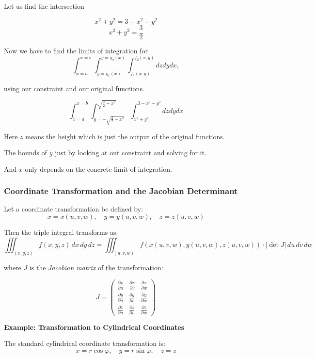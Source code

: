 Let us find the intersection

\[
x^2 + y^2 = 3 -x^2 - y^2 
\]
\[
x^2 + y^2 = \frac{3}{2}
\]

Now we have to find the limits of integration for 
\[
\int_{x=a}^{x=b}\int_{y=g_1(x)}^{y=g_2(x)} \int_{f_1(x,y)}^{f_2(x,y)} dz dy dx,
\]

using our constraint and our original functions.

\[
\int_{x=a}^{x=b}\int_{y=-\sqrt{\frac{3}{2} - x^2}}^{\sqrt{\frac{3}{2} -x^2}} \int_{x^2 + y^3}^{3-x^2-y^2} dz dy dx
\]

Here \(z\) means the height which is just the output
of the original functions.

The bounds of \(y\) just by looking at out constraint and solving for it.

And \(x\) only depends on the concrete limit of integration.


\subsubsection{Coordinate Transformation and the Jacobian Determinant}

Let a coordinate transformation be defined by:
\[
x = x(u, v, w), \quad y = y(u, v, w), \quad z = z(u, v, w)
\]

Then the triple integral transforms as:
\[
\iiint_{(x, y, z)} f(x, y, z)\, dx\, dy\, dz = \iiint_{(u, v, w)} f(x(u, v, w), y(u, v, w), z(u, v, w)) \cdot \left| \det J \right|\, du\, dv\, dw
\]

where \( J \) is the \emph{Jacobian matrix} of the transformation:

\[
J = 
\begin{pmatrix}
\frac{\partial x}{\partial u} & \frac{\partial x}{\partial v} & \frac{\partial x}{\partial w} \\
\frac{\partial y}{\partial u} & \frac{\partial y}{\partial v} & \frac{\partial y}{\partial w} \\
\frac{\partial z}{\partial u} & \frac{\partial z}{\partial v} & \frac{\partial z}{\partial w}
\end{pmatrix}
\]

\vspace{\baselineskip}
\textbf{Example: Transformation to Cylindrical Coordinates}
\vspace{\baselineskip}

The standard cylindrical coordinate transformation is:
\[
x = r \cos \varphi, \quad y = r \sin \varphi, \quad z = z
\]

